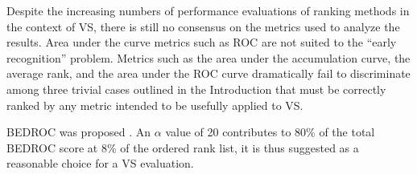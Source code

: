 Despite the increasing numbers of performance evaluations of ranking methods in the context of VS, there is still no consensus on the metrics used to analyze the results. Area under the curve metrics such as ROC are not suited to the “early recognition” problem. Metrics such as the area under the accumulation curve, the average rank, and the area under the ROC curve dramatically fail to discriminate among three trivial cases outlined in the Introduction that must be correctly ranked by any metric intended to be usefully applied to VS.

BEDROC was proposed \citep{490}. An $\alpha$ value of 20 contributes to 80\% of the total BEDROC score at 8\% of the ordered rank list, it is thus suggested as a reasonable choice for a VS evaluation.

\chapterend

